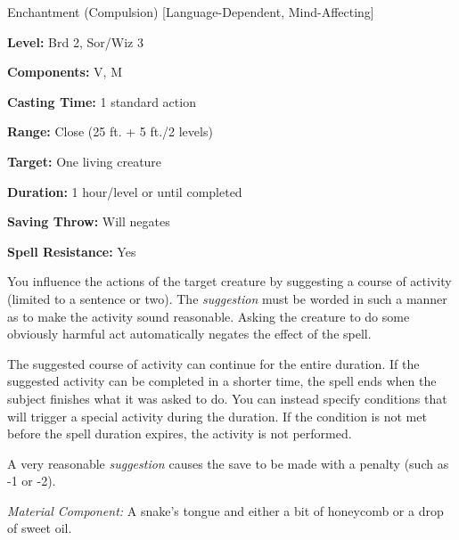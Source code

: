 
Enchantment (Compulsion) [Language-Dependent, Mind-Affecting]

\textbf{Level:} Brd 2, Sor/Wiz 3

\textbf{Components:} V, M

\textbf{Casting Time:} 1 standard action

\textbf{Range:} Close (25 ft. + 5 ft./2 levels)

\textbf{Target:} One living creature

\textbf{Duration:} 1 hour/level or until completed

\textbf{Saving Throw:} Will negates

\textbf{Spell Resistance:} Yes

You influence the actions of the target creature by suggesting a course of activity 
(limited to a sentence or two). The \textit{suggestion} must be worded in such 
a manner as to make the activity sound reasonable. Asking the creature to do some 
obviously harmful act automatically negates the effect of the spell. 

The suggested course of activity can continue for the entire duration. If the suggested 
activity can be completed in a shorter time, the spell ends when the subject finishes 
what it was asked to do. You can instead specify conditions that will trigger a 
special activity during the duration. If the condition is not met before the spell 
duration expires, the activity is not performed.

A very reasonable \textit{suggestion} causes the save to be made with a penalty 
(such as -1 or -2).

\textit{Material Component:} A snake's tongue and either a bit of honeycomb or 
a drop of sweet oil.

